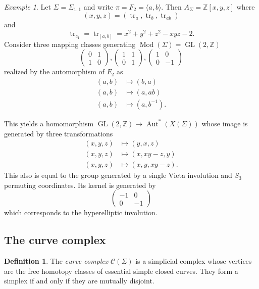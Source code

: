 \documentclass[11pt]{amsart}
\numberwithin{theorem}{section}
\theoremstyle{definition}
\newtheorem{definition}[theorem]{Definition}
\theoremstyle{remark}
\newtheorem{example}[theorem]{Example}
\newcommand{\Z}{{\mathbb{Z}}}
\newcommand{\Ccal}{{\mathcal{C}}}
\DeclareMathOperator{\Aut}{Aut}
\DeclareMathOperator{\GL}{GL}
\DeclareMathOperator{\Mod}{Mod}
\DeclareMathOperator{\tr}{tr}
\newcommand{\<}{\langle}
\renewcommand{\>}{\rangle}
\begin{document}
\begin{example}
    Let $\Sigma = \Sigma_{1, 1}$ and write $\pi = F_2 = \langle a, b \rangle$. Then $A_\Sigma = \Z[x, y, z]$ where
    \[
    (x, y, z) = (\tr_a, \tr_b, \tr_{ab})
    \]
    and
    \[
    \tr_{c_1} = \tr_{[a,b]} = x^2 + y^2 + z^2 - xyz - 2.
    \]
    Consider three mapping classes generating $\Mod(\Sigma) = \GL(2, \Z)$
    \[
    \begin{pmatrix}
        0 & 1 \\
        1 & 0
    \end{pmatrix},
    \begin{pmatrix}
        1 & 1 \\
        0 & 1
    \end{pmatrix},
    \begin{pmatrix}
        1 & 0 \\
        0 & -1
    \end{pmatrix}
    \]
    realized by the automorphism of $F_2$ as
    \begin{align*}
        (a, b) &\mapsto (b, a) \\ 
        (a, b) &\mapsto (a, ab) \\
        (a, b) &\mapsto (a, b^{-1}).
    \end{align*}
    
    This yields a homomorphism $\GL(2, \Z) \rightarrow \Aut^*(X(\Sigma))$ whose image is generated by three transformations
    \begin{align*}
        (x, y, z) &\mapsto (y, x, z) \\
        (x, y, z) &\mapsto (x, xy-z, y) \\
        (x, y, z) &\mapsto (x, y, xy-z).
    \end{align*}
    This also is equal to the group generated by a single Vieta involution and $S_3$ permuting coordinates. Its kernel is generated by
    \[
    \begin{pmatrix}
        -1 & 0 \\
        0 & -1
    \end{pmatrix}
    \]
    which corresponds to the hyperelliptic involution.
    
    
\end{example}

\subsection{The curve complex}

\begin{definition}
    The \textit{curve complex} $\Ccal(\Sigma)$ is a simplicial complex whose vertices are the free homotopy classes of essential simple closed curves. They form a simplex if and only if they are mutually disjoint.
\end{definition}
\end{document}
